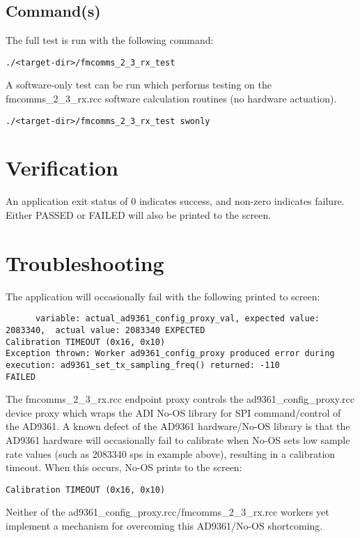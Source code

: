 \subsection{Command(s)}
The full test is run with the following command:
\begin{lstlisting}
./<target-dir>/fmcomms_2_3_rx_test
\end{lstlisting}
A software-only test can be run which performs testing on the fmcomms\_2\_3\_rx.rcc software calculation routines (no hardware actuation).
\begin{lstlisting}
./<target-dir>/fmcomms_2_3_rx_test swonly
\end{lstlisting}
\section{Verification}
An application exit status of 0 indicates success, and non-zero indicates failure. Either PASSED or FAILED will also be printed to the screen.

\section{Troubleshooting}
The application will occasionally fail with the following printed to screen:
\begin{lstlisting}
      variable: actual_ad9361_config_proxy_val, expected value: 2083340,  actual value: 2083340 EXPECTED
Calibration TIMEOUT (0x16, 0x10)
Exception thrown: Worker ad9361_config_proxy produced error during execution: ad9361_set_tx_sampling_freq() returned: -110
FAILED
\end{lstlisting}
The fmcomms\_2\_3\_rx.rcc endpoint proxy controls the ad9361\_config\_proxy.rcc device proxy which wraps the ADI No-OS library for SPI command/control of the AD9361. A known defect of the AD9361 hardware/No-OS library is that the AD9361 hardware will occasionally fail to calibrate when No-OS sets low sample rate values (such as 2083340 sps in example above), resulting in a calibration timeout. When this occurs, No-OS prints to the screen:
\begin{lstlisting}
Calibration TIMEOUT (0x16, 0x10)
\end{lstlisting}
Neither of the ad9361\_config\_proxy.rcc/fmcomms\_2\_3\_rx.rcc workers yet implement a mechanism for overcoming this AD9361/No-OS shortcoming.



